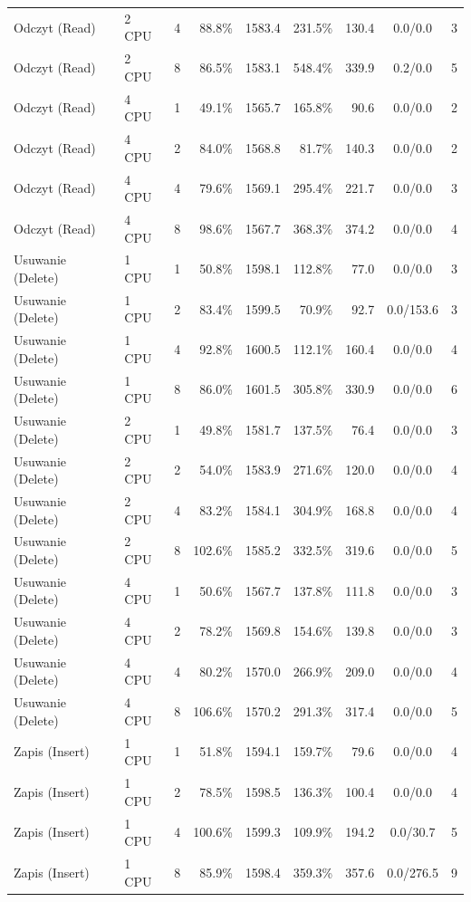 \begin{table}[ht]
{\begin{tabular}{llcrrrrcc}
Odczyt (Read) & 2 CPU & 4 & 88.8\% & 1583.4 & 231.5\% & 130.4 & 0.0/0.0 & 3 \\
Odczyt (Read) & 2 CPU & 8 & 86.5\% & 1583.1 & 548.4\% & 339.9 & 0.2/0.0 & 5 \\
Odczyt (Read) & 4 CPU & 1 & 49.1\% & 1565.7 & 165.8\% & 90.6 & 0.0/0.0 & 2 \\
Odczyt (Read) & 4 CPU & 2 & 84.0\% & 1568.8 & 81.7\% & 140.3 & 0.0/0.0 & 2 \\
Odczyt (Read) & 4 CPU & 4 & 79.6\% & 1569.1 & 295.4\% & 221.7 & 0.0/0.0 & 3 \\
Odczyt (Read) & 4 CPU & 8 & 98.6\% & 1567.7 & 368.3\% & 374.2 & 0.0/0.0 & 4 \\
Usuwanie (Delete) & 1 CPU & 1 & 50.8\% & 1598.1 & 112.8\% & 77.0 & 0.0/0.0 & 3 \\
Usuwanie (Delete) & 1 CPU & 2 & 83.4\% & 1599.5 & 70.9\% & 92.7 & 0.0/153.6 & 3 \\
Usuwanie (Delete) & 1 CPU & 4 & 92.8\% & 1600.5 & 112.1\% & 160.4 & 0.0/0.0 & 4 \\
Usuwanie (Delete) & 1 CPU & 8 & 86.0\% & 1601.5 & 305.8\% & 330.9 & 0.0/0.0 & 6 \\
Usuwanie (Delete) & 2 CPU & 1 & 49.8\% & 1581.7 & 137.5\% & 76.4 & 0.0/0.0 & 3 \\
Usuwanie (Delete) & 2 CPU & 2 & 54.0\% & 1583.9 & 271.6\% & 120.0 & 0.0/0.0 & 4 \\
Usuwanie (Delete) & 2 CPU & 4 & 83.2\% & 1584.1 & 304.9\% & 168.8 & 0.0/0.0 & 4 \\
Usuwanie (Delete) & 2 CPU & 8 & 102.6\% & 1585.2 & 332.5\% & 319.6 & 0.0/0.0 & 5 \\
Usuwanie (Delete) & 4 CPU & 1 & 50.6\% & 1567.7 & 137.8\% & 111.8 & 0.0/0.0 & 3 \\
Usuwanie (Delete) & 4 CPU & 2 & 78.2\% & 1569.8 & 154.6\% & 139.8 & 0.0/0.0 & 3 \\
Usuwanie (Delete) & 4 CPU & 4 & 80.2\% & 1570.0 & 266.9\% & 209.0 & 0.0/0.0 & 4 \\
Usuwanie (Delete) & 4 CPU & 8 & 106.6\% & 1570.2 & 291.3\% & 317.4 & 0.0/0.0 & 5 \\
Zapis (Insert) & 1 CPU & 1 & 51.8\% & 1594.1 & 159.7\% & 79.6 & 0.0/0.0 & 4 \\
Zapis (Insert) & 1 CPU & 2 & 78.5\% & 1598.5 & 136.3\% & 100.4 & 0.0/0.0 & 4 \\
Zapis (Insert) & 1 CPU & 4 & 100.6\% & 1599.3 & 109.9\% & 194.2 & 0.0/30.7 & 5 \\
Zapis (Insert) & 1 CPU & 8 & 85.9\% & 1598.4 & 359.3\% & 357.6 & 0.0/276.5 & 9 \\

\end{tabular}}
\end{table}
